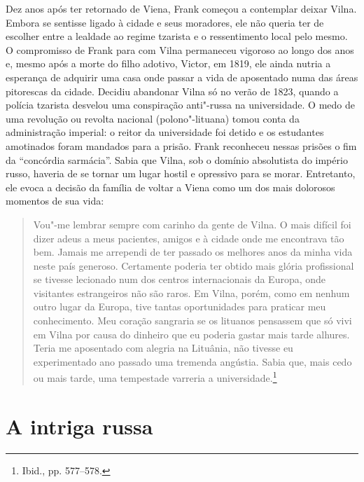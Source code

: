 Dez anos após ter retornado de Viena, Frank começou a contemplar deixar
Vilna. Embora se sentisse ligado à cidade e seus moradores, ele não
queria ter de escolher entre a lealdade ao regime tzarista e o
ressentimento local pelo mesmo. O compromisso de Frank para com Vilna
permaneceu vigoroso ao longo dos anos e, mesmo após a morte do filho
adotivo, Victor, em 1819, ele ainda nutria a esperança de adquirir uma
casa onde passar a vida de aposentado numa das áreas pitorescas da
cidade. Decidiu abandonar Vilna só no verão de 1823, quando a polícia
tzarista desvelou uma conspiração anti"-russa na universidade. O medo de
uma revolução ou revolta nacional (polono"-lituana) tomou conta da
administração imperial: o reitor da universidade foi detido e os
estudantes amotinados foram mandados para a prisão. Frank reconheceu
nessas prisões o fim da ``concórdia sarmácia''. Sabia que Vilna, sob o
domínio absolutista do império russo, haveria de se tornar um lugar
hostil e opressivo para se morar. Entretanto, ele evoca a decisão da
família de voltar a Viena como um dos mais dolorosos momentos de sua
vida:

\begin{quote}
Vou"-me lembrar sempre com carinho da gente de Vilna. O mais difícil foi
dizer adeus a meus pacientes, amigos e à cidade onde me encontrava tão
bem. Jamais me arrependi de ter passado os melhores anos da minha vida
neste país generoso. Certamente poderia ter obtido mais glória
profissional se tivesse lecionado num dos centros internacionais da
Europa, onde visitantes estrangeiros não são raros. Em Vilna, porém,
como em nenhum outro lugar da Europa, tive tantas oportunidades para
praticar meu conhecimento. Meu coração sangraria se os lituanos
pensassem que só vivi em Vilna por causa do dinheiro que eu poderia
gastar mais tarde alhures. Teria me aposentado com alegria na Lituânia, 
não tivesse eu experimentado ano passado uma tremenda angústia. Sabia
que, mais cedo ou mais tarde, uma tempestade varreria a
universidade.\footnote{Ibid., pp. 577--578.}
\end{quote}

%

\chapter{A intriga russa}

